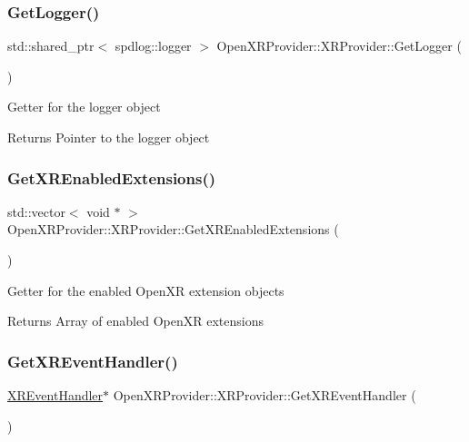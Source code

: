 \subsubsection{\texorpdfstring{GetLogger()}{GetLogger()}}
{\footnotesize\ttfamily std\+::shared\+\_\+ptr$<$ spdlog\+::logger $>$ Open\+X\+R\+Provider\+::\+X\+R\+Provider\+::\+Get\+Logger (\begin{DoxyParamCaption}{ }\end{DoxyParamCaption})\hspace{0.3cm}{\ttfamily [inline]}}

Getter for the logger object \begin{DoxyReturn}{Returns}
Pointer to the logger object 
\end{DoxyReturn}
\mbox{\label{class_open_x_r_provider_1_1_x_r_provider_a0a7f5774b7db559ca3f2df8b81696ec3}} 
\subsubsection{\texorpdfstring{GetXREnabledExtensions()}{GetXREnabledExtensions()}}
{\footnotesize\ttfamily std\+::vector$<$ void $\ast$ $>$ Open\+X\+R\+Provider\+::\+X\+R\+Provider\+::\+Get\+X\+R\+Enabled\+Extensions (\begin{DoxyParamCaption}{ }\end{DoxyParamCaption})\hspace{0.3cm}{\ttfamily [inline]}}

Getter for the enabled Open\+XR extension objects \begin{DoxyReturn}{Returns}
Array of enabled Open\+XR extensions 
\end{DoxyReturn}
\mbox{\label{class_open_x_r_provider_1_1_x_r_provider_a6fc3eedaf1b8b942fdf2bee8a1d21550}} 
\subsubsection{\texorpdfstring{GetXREventHandler()}{GetXREventHandler()}}
{\footnotesize\ttfamily \mbox{\hyperlink{class_open_x_r_provider_1_1_x_r_event_handler}{X\+R\+Event\+Handler}}$\ast$ Open\+X\+R\+Provider\+::\+X\+R\+Provider\+::\+Get\+X\+R\+Event\+Handler (\begin{DoxyParamCaption}{ }\end{DoxyParamCaption})\hspace{0.3cm}{\ttfamily [inline]}}

